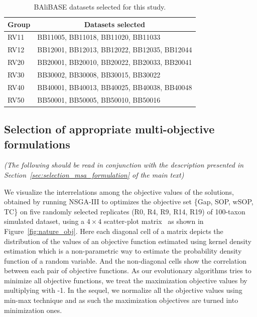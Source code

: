 \begin{table}[htbp]
	\small
	\centering
	\caption{ BAliBASE datasets selected for this study.}
	\begin{tabular}{|l|l|}
		\hline
		\multicolumn{1}{|c|}{Group} & \multicolumn{1}{c|}{Datasets selected} \\
		\hline
		RV11  & BB11005, BB11018, BB11020, BB11033 \\
		\hline
		RV12  & BB12001, BB12013, BB12022, BB12035, BB12044 \\
		\hline
		RV20  & BB20001, BB20010, BB20022, BB20033, BB20041 \\
		\hline
		RV30  & BB30002, BB30008, BB30015, BB30022 \\
		\hline
		RV40  & BB40001, BB40013, BB40025, BB40038, BB40048 \\ %
		\hline
		RV50  & BB50001, BB50005, BB50010, BB50016 \\
		\hline
	\end{tabular}%
	\label{tab:balibase}%
\end{table}%

\subsection{Selection of appropriate multi-objective formulations}
\textit{(The following should be read in conjunction with the description presented in Section~\ref{sec:selection_msa_formulation} of the main text)} 

We visualize the interrelations among the objective values of the solutions, obtained by running NSGA-III to optimizes the objective set \{Gap, SOP, wSOP, TC\} on five randomly selected replicates (R0, R4, R9, R14, R19) of 100-taxon simulated dataset, using a $ 4\times4 $ scatter-plot matrix~\cite{kalyanmoy2001multi} as shown in Figure~\ref{fig:nature_obj}. Here each diagonal cell of a matrix depicts the distribution of the values of an objective function estimated using kernel density estimation which is a non-parametric way to estimate the probability density function of a random variable. And the non-diagonal cells show the correlation between each pair of objective functions. As our evolutionary algorithms tries to minimize all objective functions, we treat the maximization objective values by multiplying with -1. In the sequel, we normalize all the objective values using min-max technique and as such the maximization objectives are turned into minimization ones.

